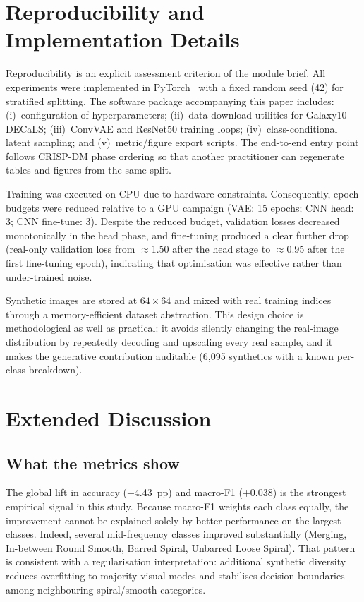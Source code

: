 \documentclass[conference]{IEEEtran}
\begin{document}
\section{Reproducibility and Implementation Details}
\label{sec:repro}
Reproducibility is an explicit assessment criterion of the module brief. All experiments were implemented in PyTorch~\cite{paszke2019pytorch} with a fixed random seed (42) for stratified splitting. The software package accompanying this paper includes: (i)~configuration of hyperparameters; (ii)~data download utilities for Galaxy10 DECaLS; (iii)~ConvVAE and ResNet50 training loops; (iv)~class-conditional latent sampling; and (v)~metric/figure export scripts. The end-to-end entry point follows CRISP-DM phase ordering so that another practitioner can regenerate tables and figures from the same split.

Training was executed on CPU due to hardware constraints. Consequently, epoch budgets were reduced relative to a GPU campaign (VAE: 15 epochs; CNN head: 3; CNN fine-tune: 3). Despite the reduced budget, validation losses decreased monotonically in the head phase, and fine-tuning produced a clear further drop (real-only validation loss from $\approx$1.50 after the head stage to $\approx$0.95 after the first fine-tuning epoch), indicating that optimisation was effective rather than under-trained noise.

Synthetic images are stored at $64\times64$ and mixed with real training indices through a memory-efficient dataset abstraction. This design choice is methodological as well as practical: it avoids silently changing the real-image distribution by repeatedly decoding and upscaling every real sample, and it makes the generative contribution auditable (6{,}095 synthetics with a known per-class breakdown).

\section{Extended Discussion}
\label{sec:discussion}

\subsection{What the metrics show}
The global lift in accuracy (+4.43~pp) and macro-F1 (+0.038) is the strongest empirical signal in this study. Because macro-F1 weights each class equally, the improvement cannot be explained solely by better performance on the largest classes. Indeed, several mid-frequency classes improved substantially (Merging, In-between Round Smooth, Barred Spiral, Unbarred Loose Spiral). That pattern is consistent with a regularisation interpretation: additional synthetic diversity reduces overfitting to majority visual modes and stabilises decision boundaries among neighbouring spiral/smooth categories.
\end{document}
